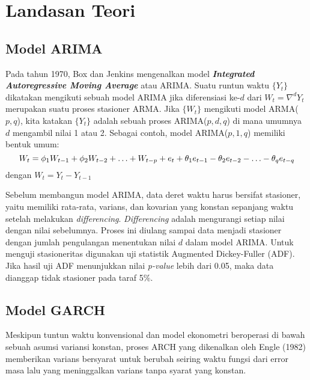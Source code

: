 \documentclass[a4paper,12pt]{article}
\begin{document}
\section{Landasan Teori}

\subsection{Model ARIMA}

Pada tahun 1970, Box dan Jenkins mengenalkan model \textbf{\textit{Integrated Autoregressive Moving Average}} atau ARIMA. Suatu runtun waktu $\{Y_t\}$ dikatakan mengikuti sebuah model ARIMA jika diferensiasi ke-$d$ dari $W_t = \nabla ^dY_t$ merupakan suatu proses stasioner ARMA. Jika $\{W_t\}$ mengikuti model ARMA($p, q$), kita katakan $\{Y_t\}$ adalah sebuah proses ARIMA($p,d,q$) di mana umumnya $d$ mengambil nilai 1 atau 2. Sebagai contoh, model ARIMA($p, 1, q$) memiliki bentuk umum:
\begin{equation}
\label{eq:arima}
W_t = \phi_1W_{t-1} + \phi_2W_{t-2} + \ldots + W_{t-p} + e_t + \theta_1e_{t-1}-\theta_2e_{t-2} - \ldots - \theta_qe_{t-q}\\
\end{equation}
dengan $W_t = Y_t - Y_{t-1}$

Sebelum membangun model ARIMA, data deret waktu harus bersifat stasioner, yaitu memiliki rata-rata, varians, dan kovarian yang konstan sepanjang waktu setelah melakukan \textit{differencing}. \textit{Differencing} adalah mengurangi setiap nilai dengan nilai sebelumnya. Proses ini diulang sampai data menjadi stasioner dengan jumlah pengulangan menentukan nilai $d$ dalam model ARIMA. Untuk menguji stasioneritas digunakan uji statistik Augmented Dickey-Fuller (ADF). Jika hasil uji ADF menunjukkan nilai \textit{p-value} lebih dari 0.05, maka data dianggap tidak stasioner pada taraf 5$\%$.

\subsection{Model GARCH}

Meskipun tuntun waktu konvensional dan model ekonometri beroperasi di bawah sebuah asumsi variansi konstan, proses ARCH yang dikenalkan oleh Engle (1982) memberikan varians bersyarat untuk berubah seiring waktu fungsi dari error masa lalu yang meninggalkan varians tanpa syarat yang konstan. 
\end{document}
